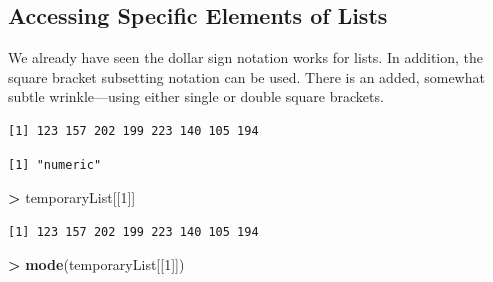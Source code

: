\documentclass[]{krantz}
\makeatletter
\newenvironment{Shaded}{\begin{snugshade}}{\end{snugshade}}
\newcommand{\DecValTok}[1]{\textcolor[rgb]{0.06,0.06,0.06}{#1}}
\newcommand{\KeywordTok}[1]{\textcolor[rgb]{0.27,0.27,0.27}{\textbf{#1}}}
\newcommand{\NormalTok}[1]{#1}
\newcommand{\OperatorTok}[1]{\textcolor[rgb]{0.43,0.43,0.43}{\textbf{#1}}}
\newcommand{\StringTok}[1]{\textcolor[rgb]{0.5,0.5,0.5}{#1}}
\newenvironment{kframe}{%
\medskip{}
\setlength{\fboxsep}{.8em}
 \def\at@end@of@kframe{}%
 \ifinner\ifhmode%
  \def\at@end@of@kframe{\end{minipage}}%
  \begin{minipage}{\columnwidth}%
 \fi\fi%
 \def\FrameCommand##1{\hskip\@totalleftmargin \hskip-\fboxsep
 \colorbox{shadecolor}{##1}\hskip-\fboxsep
     \hskip-\linewidth \hskip-\@totalleftmargin \hskip\columnwidth}%
 \MakeFramed {\advance\hsize-\width
   \@totalleftmargin\z@ \linewidth\hsize
   \@setminipage}}%
 {\par\unskip\endMakeFramed%
 \at@end@of@kframe}
\renewenvironment{Shaded}{\begin{kframe}}{\end{kframe}}
\makeatother
\begin{document}
\hypertarget{accessing-specific-elements-of-lists}{%
\subsection{Accessing Specific Elements of Lists}\label{accessing-specific-elements-of-lists}}

We already have seen the dollar sign notation works for lists. In addition, the square bracket subsetting notation can be used. There is an added, somewhat subtle wrinkle---using either single or double square brackets.

\begin{Shaded}
\end{Shaded}

\begin{verbatim}
[1] 123 157 202 199 223 140 105 194
\end{verbatim}

\begin{Shaded}
\end{Shaded}

\begin{verbatim}
[1] "numeric"
\end{verbatim}

\begin{Shaded}
\begin{Highlighting}[]
\OperatorTok{>}\StringTok{ }\NormalTok{temporaryList[[}\DecValTok{1}\NormalTok{]]}
\end{Highlighting}
\end{Shaded}

\begin{verbatim}
[1] 123 157 202 199 223 140 105 194
\end{verbatim}

\begin{Shaded}
\begin{Highlighting}[]
\OperatorTok{>}\StringTok{ }\KeywordTok{mode}\NormalTok{(temporaryList[[}\DecValTok{1}\NormalTok{]])}
\end{Highlighting}
\end{Shaded}
\end{document}
